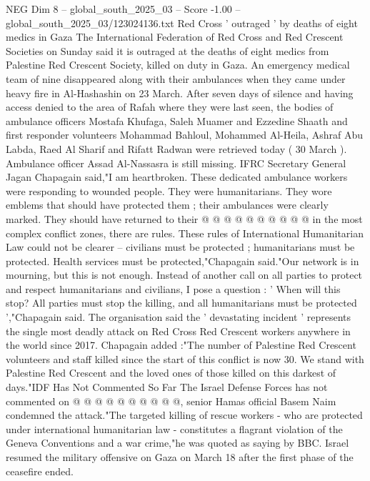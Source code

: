 \begin{textsample}{NEG Dim 8 – global\_south\_2025\_03 – Score -1.00 – global\_south\_2025\_03/123024136.txt}  \label{ex:f8_neg_073}
Red Cross ' outraged ' by deaths of eight medics in Gaza The International Federation of Red Cross and Red Crescent Societies on Sunday said it is outraged at the deaths of eight medics from Palestine Red Crescent Society, killed on duty in Gaza.
An emergency medical team of nine disappeared along with their ambulances when they came under heavy fire in Al-Hashashin on 23 March.
After seven days of silence and having access denied to the area of Rafah where they were last seen, the bodies of ambulance officers Mostafa Khufaga, Saleh Muamer and Ezzedine Shaath and first responder volunteers Mohammad Bahloul, Mohammed Al-Heila, Ashraf Abu Labda, Raed Al Sharif and Rifatt Radwan were retrieved today ( 30 March ).
Ambulance officer Assad Al-Nassasra is still missing.
IFRC Secretary General Jagan Chapagain said,"I am heartbroken.
These dedicated ambulance workers were responding to wounded people.
They were humanitarians.
They wore emblems that should have protected them ; their ambulances were clearly marked.
They should have returned to their @ @ @ @ @ @ @ @ @ @ in the most complex conflict zones, there are rules.
These rules of International Humanitarian Law could not be clearer -- civilians must be protected ; humanitarians must be protected.
Health services must be protected,"Chapagain said."Our network is in mourning, but this is not enough.
Instead of another call on all parties to protect and respect humanitarians and civilians, I pose a question : ' When will this stop?
All parties must stop the killing, and all humanitarians must be protected ',"Chapagain said.
The organisation said the ' devastating incident ' represents the single most deadly attack on Red Cross Red Crescent workers anywhere in the world since 2017.
Chapagain added :"The number of Palestine Red Crescent volunteers and staff killed since the start of this conflict is now 30.
We stand with Palestine Red Crescent and the loved ones of those killed on this darkest of days."IDF Has Not Commented So Far The Israel Defense Forces has not commented on @ @ @ @ @ @ @ @ @ @, senior Hamas official Basem Naim condemned the attack."The targeted killing of rescue workers - who are protected under international humanitarian law - constitutes a flagrant violation of the Geneva Conventions and a war crime,"he was quoted as saying by BBC.
Israel resumed the military offensive on Gaza on March 18 after the first phase of the ceasefire ended.

\end{textsample}
